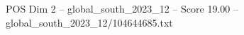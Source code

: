 \begin{textsample}{POS Dim 2 – global\_south\_2023\_12 – Score 19.00 – global\_south\_2023\_12/104644685.txt}
\end{textsample}
